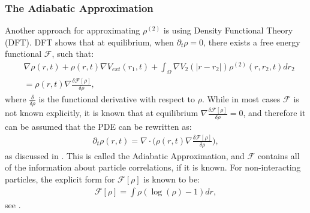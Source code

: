 \subsubsection{The Adiabatic Approximation}
Another approach for approximating $\rho^{(2)}$ is using Density Functional Theory (DFT). DFT shows that at equilibrium, when $\partial_t \rho=0$, there exists a free energy functional $\mathcal{F}$, such that:
\begin{align*}
&\nabla \rho(r,t)
+ \rho(r,t)\nabla V_{ext}(r_1,t) 
+ \int_\Omega \nabla  V_2(|r - r_2|) \rho^{(2)}(r,r_2,t) dr_2 \\
 &= \rho(r,t) \nabla \frac{\delta \mathcal{F[\rho]}}{\delta \rho},
\end{align*}
where $\frac{\delta}{\delta \rho}$ is the functional derivative with respect to $\rho$.
While in most cases $\mathcal{F}$ is not known explicitly, it is known that at equilibrium $\nabla \frac{\delta \mathcal{F[\rho]}}{\delta \rho}=0$, and therefore it can be assumed that the PDE can be rewritten as:
\begin{align}\label{eqnAdiaAprox1}
\partial_t \rho(r,t) = \nabla \cdot \bigg( \rho(r,t) \nabla \frac{\delta \mathcal{F[\rho]}}{\delta \rho} \bigg), 
\end{align}
as discussed in \cite{GoddardPseudospectralCode1}.
This is called the Adiabatic Approximation, and $\mathcal{F}$ contains all of the information about particle correlations, if it is known.
For non-interacting particles, the explicit form for $\mathcal{F}[\rho]$ is known to be:
\begin{align}\label{eqnFhardrod}
\mathcal{F}[\rho] = \int \rho(\log(\rho)-1) dr,
\end{align}
see \cite{Tarazona2008}.

